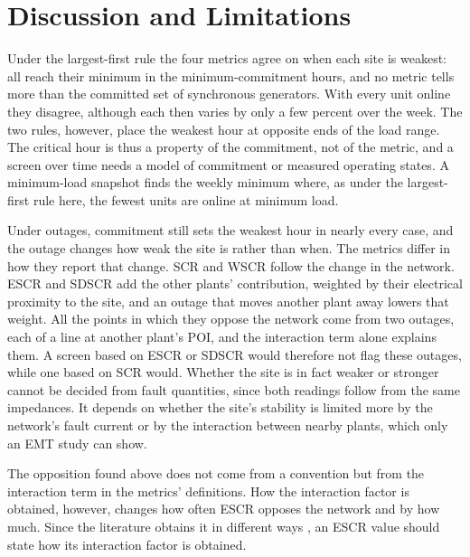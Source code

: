 \section{Discussion and Limitations}
\label{sec:discussion}

Under the largest-first rule the four metrics agree on when each site is weakest: all reach
their minimum in the minimum-commitment hours, and no metric tells more than the committed set
of synchronous generators. With every unit online they disagree, although each then varies by
only a few percent over the week. The two rules, however,
place the weakest hour at opposite ends of the load range. The critical hour is thus a property
of the commitment, not of the metric, and a screen over time needs a model of commitment or
measured operating states. A minimum-load snapshot finds the weekly minimum where, as under
the largest-first rule here, the fewest units are online at minimum load.

Under outages, commitment still sets the weakest hour in nearly every case, and the outage
changes how weak the site is rather than when. The metrics differ in how they report that
change. SCR and WSCR follow the change in the network.
ESCR and SDSCR add the other plants' contribution, weighted by their electrical proximity to the site,
and an outage that moves another plant away lowers that weight. All the points in which they
oppose the network come from two outages, each of a line at another plant's POI, and the
interaction term alone explains them. A screen based on ESCR or SDSCR would therefore not flag
these outages, while one based on SCR would. Whether the site is in fact weaker or stronger 
cannot be decided from fault quantities, since both readings follow from the same impedances. 
It depends on whether the site's stability is limited more by the network's fault current or 
by the interaction between nearby plants, which only an EMT study can show.

The opposition found above does not come from a convention but from the interaction term in the
metrics' definitions. How the interaction factor is obtained, however, changes how often ESCR
opposes the network and by how much. Since the literature obtains it in different ways \cite{cigre364,ieee2800,fingrid2023}, an ESCR value should state how its
interaction factor is obtained.

